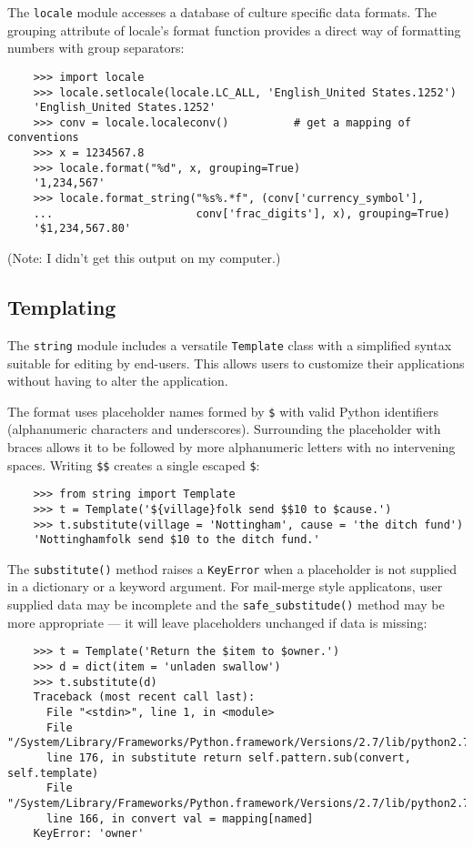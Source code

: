 \documentclass[UTF8]{article}
\begin{document}
The \texttt{locale} module accesses a database of culture specific data formats. The grouping
attribute of locale's format function provides a direct way of formatting numbers with group
separators:
\begin{verbatim}
    >>> import locale
    >>> locale.setlocale(locale.LC_ALL, 'English_United States.1252')
    'English_United States.1252'
    >>> conv = locale.localeconv()          # get a mapping of conventions
    >>> x = 1234567.8
    >>> locale.format("%d", x, grouping=True)
    '1,234,567'
    >>> locale.format_string("%s%.*f", (conv['currency_symbol'],
    ...                      conv['frac_digits'], x), grouping=True)
    '$1,234,567.80'
\end{verbatim}
(Note: I didn't get this output on my computer.)

\subsection{Templating}
The \texttt{string} module includes a versatile \texttt{Template} class with a simplified syntax
suitable for editing by end-users. This allows users to customize their applications without having
to alter the application.

The format uses placeholder names formed by \texttt{\$} with valid Python identifiers (alphanumeric
characters and underscores). Surrounding the placeholder with braces allows it to be followed by
more alphanumeric letters with no intervening spaces. Writing \texttt{\$\$} creates a single
escaped \texttt{\$}:
\begin{verbatim}
    >>> from string import Template
    >>> t = Template('${village}folk send $$10 to $cause.')
    >>> t.substitute(village = 'Nottingham', cause = 'the ditch fund')
    'Nottinghamfolk send $10 to the ditch fund.'
\end{verbatim}

The \texttt{substitute()} method raises a \texttt{KeyError} when a placeholder is not supplied in a
dictionary or a keyword argument. For mail-merge style applicatons, user supplied data may be
incomplete and the \texttt{safe\_substitude()} method may be more appropriate --- it will leave
placeholders unchanged if data is missing:
\begin{verbatim}
    >>> t = Template('Return the $item to $owner.')
    >>> d = dict(item = 'unladen swallow')
    >>> t.substitute(d)
    Traceback (most recent call last):
      File "<stdin>", line 1, in <module>
      File "/System/Library/Frameworks/Python.framework/Versions/2.7/lib/python2.7/string.py",
      line 176, in substitute return self.pattern.sub(convert, self.template)
      File "/System/Library/Frameworks/Python.framework/Versions/2.7/lib/python2.7/string.py",
      line 166, in convert val = mapping[named]
    KeyError: 'owner'
\end{verbatim}
\end{document}
